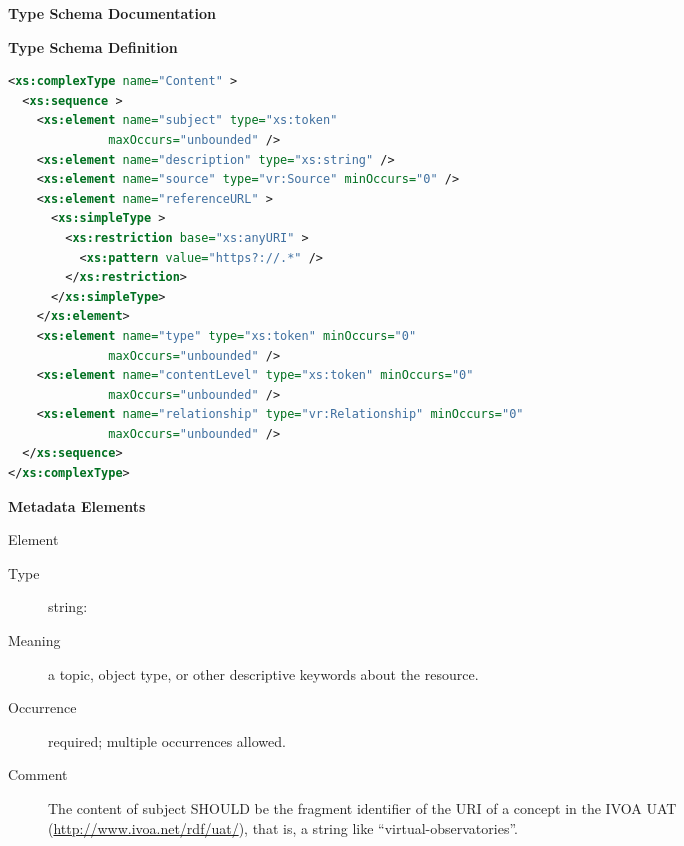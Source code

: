\documentclass[11pt,a4paper]{ivoa}
\begin{document}
\begin{generated}
\begingroup
        \renewcommand*\descriptionlabel[1]{%
        \hbox to 5.5em{\emph{#1}\hfil}}\vspace{2ex}\noindent\textbf{ Type Schema Documentation}


\vspace{1ex}\noindent\textbf{ Type Schema Definition}

\begin{lstlisting}[language=XML,basicstyle=\footnotesize]
<xs:complexType name="Content" >
  <xs:sequence >
    <xs:element name="subject" type="xs:token"
              maxOccurs="unbounded" />
    <xs:element name="description" type="xs:string" />
    <xs:element name="source" type="vr:Source" minOccurs="0" />
    <xs:element name="referenceURL" >
      <xs:simpleType >
        <xs:restriction base="xs:anyURI" >
          <xs:pattern value="https?://.*" />
        </xs:restriction>
      </xs:simpleType>
    </xs:element>
    <xs:element name="type" type="xs:token" minOccurs="0"
              maxOccurs="unbounded" />
    <xs:element name="contentLevel" type="xs:token" minOccurs="0"
              maxOccurs="unbounded" />
    <xs:element name="relationship" type="vr:Relationship" minOccurs="0"
              maxOccurs="unbounded" />
  </xs:sequence>
</xs:complexType>
\end{lstlisting}

\vspace{0.5ex}\noindent\textbf{ Metadata Elements}

\begingroup\small\begin{bigdescription}\item[Element \xmlel{subject}]
\begin{description}
\item[Type] string: 
\item[Meaning]
               a topic, object type, or other descriptive keywords
               about the resource.

\item[Occurrence] required; multiple occurrences allowed.
\item[Comment]
             	The content of subject SHOULD be the fragment identifier of
             	the URI of a concept in the IVOA UAT
             	(\url{http://www.ivoa.net/rdf/uat/}), that is, a string like
             	“virtual-observatories”.



\end{description}
\end{bigdescription}
\end{generated}
\end{document}
